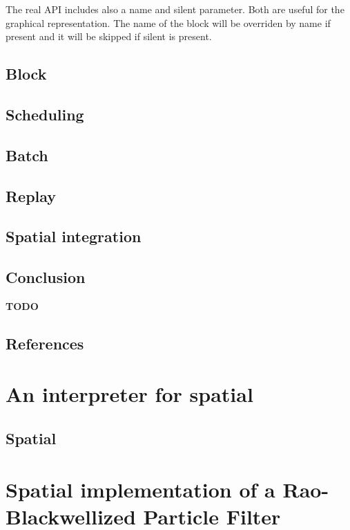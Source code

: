 \documentclass[12pt,]{article}
\begin{document}
The real API includes also a name and silent parameter. Both are useful
for the graphical representation. The name of the block will be
overriden by name if present and it will be skipped if silent is
present.

\subsection{Block}\label{block}

\subsection{Scheduling}\label{scheduling}

\subsection{Batch}\label{batch}

\subsection{Replay}\label{replay}

\subsection{Spatial integration}\label{spatial-integration}

\subsection{Conclusion}\label{conclusion-1}

\textbf{TODO}

\subsection{References}\label{references}

\section{An interpreter for spatial}\label{an-interpreter-for-spatial}

\subsection{Spatial}\label{spatial-1}

\section{Spatial implementation of a Rao-Blackwellized Particle
Filter}\label{spatial-implementation-of-a-rao-blackwellized-particle-filter}
\end{document}
